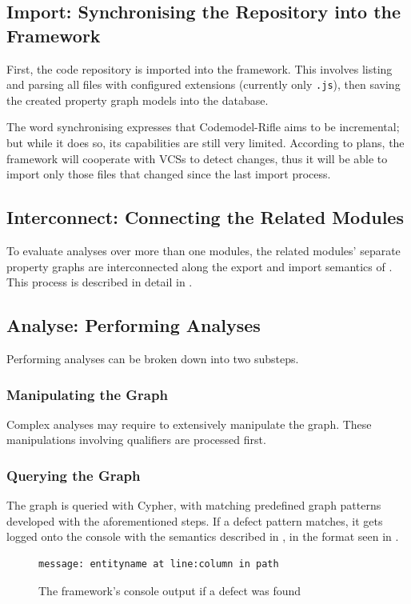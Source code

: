 \subsection{Import: Synchronising the Repository into the Framework}

First, the code repository is imported into the framework. This involves listing and parsing all files with configured extensions (currently only \lstinline{.js}), then saving the created property graph models into the database.

The word synchronising expresses that Codemodel-Rifle aims to be incremental; but while it does so, its capabilities are still very limited. According to plans, the framework will cooperate with VCSs to detect changes, thus it will be able to import only those files that changed since the last import process.


\subsection{Interconnect: Connecting the Related \es Modules}

To evaluate analyses over more than one \es modules, the related modules' separate property graphs are interconnected along the export and import semantics of \es. This process is described in detail in .


\subsection{Analyse: Performing Analyses}

Performing analyses can be broken down into two substeps.


\subsubsection{Manipulating the Graph}

Complex analyses may require to extensively manipulate the graph. These manipulations involving qualifiers are processed first.


\subsubsection{Querying the Graph}

The graph is queried with Cypher, with matching predefined graph patterns developed with the aforementioned steps. If a defect pattern matches, it gets logged onto the console with the semantics described in , in the format seen in .

\begin{figure}[!htb]
	\centering
	\begin{lstlisting}[language=Rifle, aboveskip=0em, belowskip=0em]
				message: entityname at line:column in path
	\end{lstlisting}
  \caption{The framework's console output if a defect was found}
  \label{fig:defect-found-logger}
\end{figure}